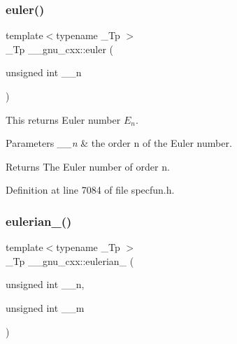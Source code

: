 \subsubsection{\texorpdfstring{euler()}{euler()}}
{\footnotesize\ttfamily template$<$typename \+\_\+\+Tp $>$ \\
\+\_\+\+Tp \+\_\+\+\_\+gnu\+\_\+cxx\+::euler (\begin{DoxyParamCaption}\item[{unsigned int}]{\+\_\+\+\_\+n }\end{DoxyParamCaption})\hspace{0.3cm}{\ttfamily [inline]}}



This returns Euler number $ E_n $. 


\begin{DoxyParams}{Parameters}
{\em \+\_\+\+\_\+n} & the order n of the Euler number. \\
\hline
\end{DoxyParams}
\begin{DoxyReturn}{Returns}
The Euler number of order n. 
\end{DoxyReturn}


Definition at line 7084 of file specfun.\+h.

\mbox{\label{group__mathsf__gnu_gadfd8810a97655d2cdd1b0e3af68a79d3}} 
\subsubsection{\texorpdfstring{eulerian\+\_()}{eulerian\_1()}\hspace{0.1cm}{\footnotesize\ttfamily [1/2]}}
{\footnotesize\ttfamily template$<$typename \+\_\+\+Tp $>$ \\
\+\_\+\+Tp \+\_\+\+\_\+gnu\+\_\+cxx\+::eulerian\+\_ (\begin{DoxyParamCaption}\item[{unsigned int}]{\+\_\+\+\_\+n,  }\item[{unsigned int}]{\+\_\+\+\_\+m }\end{DoxyParamCaption})\hspace{0.3cm}{\ttfamily [inline]}}


